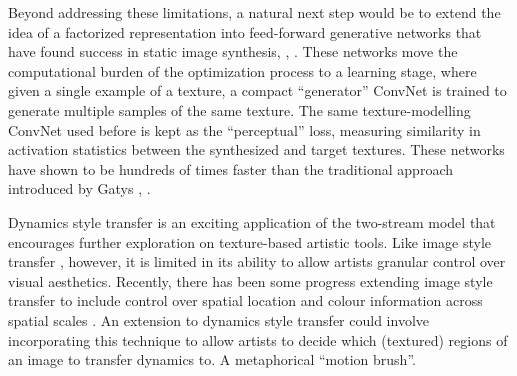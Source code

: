 Beyond addressing these limitations, a natural next step would be
to extend the idea of a factorized representation into feed-forward
generative networks that have found success in static image
synthesis, \eg, \cite{johnson2016,ulyanov2016}. These networks move the computational burden of the optimization process to a learning stage, where given a single example of a texture, a compact ``generator'' ConvNet is trained to generate multiple samples of the same texture. The same texture-modelling ConvNet used before is kept as the ``perceptual'' loss, measuring similarity in activation statistics between the synthesized and target textures. These networks have shown to be hundreds of times faster than the traditional approach introduced by Gatys \etal \cite{gatys2015}, .

Dynamics style transfer is an exciting application of the two-stream model that encourages further exploration on texture-based artistic tools. Like image style transfer \cite{gatys2016image}, however, it is limited in its ability to allow artists granular control over visual aesthetics. Recently, there has been some progress extending image style transfer to include control over spatial location and colour information across spatial scales \cite{gatys2017}. An extension to dynamics style transfer could involve incorporating this technique to allow artists to decide which (textured) regions of an image to transfer dynamics to. A metaphorical ``motion brush''.